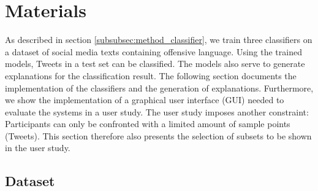\section{Materials}
As described in section \ref{subsubsec:method_classifier}, we train three classifiers on a dataset of social media texts containing offensive language. Using the trained models, Tweets in a test set can be classified. The models also serve to generate explanations for the classification result. The following section documents the implementation of the classifiers and the generation of explanations. Furthermore, we show the implementation of a graphical user interface (GUI) needed to evaluate the systems in a user study. The user study imposes another constraint: Participants can only be confronted with a limited amount of sample points (Tweets). This section therefore also presents the selection of subsets to be shown in the user study.


\subsection{Dataset}

